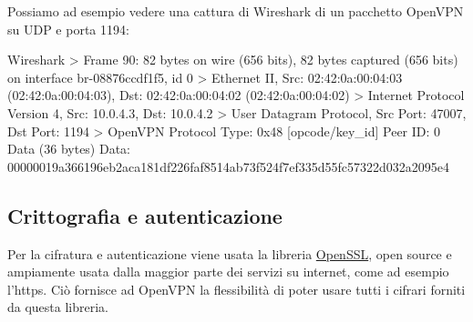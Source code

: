 Possiamo ad esempio vedere una cattura di Wireshark di un pacchetto OpenVPN su UDP e porta 1194:

\begin{bashcode}{Wireshark}{}
> Frame 90: 82 bytes on wire (656 bits), 82 bytes captured (656 bits) on interface br-08876ccdf1f5, id 0
> Ethernet II, Src: 02:42:0a:00:04:03 (02:42:0a:00:04:03), Dst: 02:42:0a:00:04:02 (02:42:0a:00:04:02)
> Internet Protocol Version 4, Src: 10.0.4.3, Dst: 10.0.4.2
> User Datagram Protocol, Src Port: 47007, Dst Port: 1194
> OpenVPN Protocol
Type: 0x48 [opcode/key_id]
Peer ID: 0
Data (36 bytes)
Data: 00000019a366196eb2aca181df226faf8514ab73f524f7ef335d55fc57322d032a2095e4
\end{bashcode}

\subsection{Crittografia e autenticazione}
\label{subsec:auth}

Per la cifratura e autenticazione viene usata la libreria \href{https://en.wikipedia.org/wiki/OpenSSL}{OpenSSL}, open source e ampiamente usata dalla maggior parte dei servizi su internet, come ad esempio l'https. Ciò fornisce ad OpenVPN la flessibilità di poter usare tutti i cifrari forniti da questa libreria.

